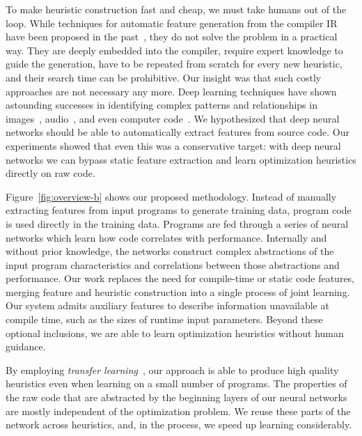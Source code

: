 To make heuristic construction fast and cheap, we must take humans out of the loop. While techniques for automatic feature generation from the compiler IR have been proposed in the past~\cite{Namolaru2010a,Leather2014}, they do not solve the problem in a practical way. They are deeply embedded into the compiler, require expert knowledge to guide the generation, have to be repeated from scratch for every new heuristic, and their search time can be prohibitive. Our insight was that such costly approaches are not necessary any more. Deep learning techniques have shown astounding successes in identifying complex patterns and relationships in images~\cite{Krizhevsky2012,He2016}, audio~\cite{Lee2009b}, and even computer code~\cite{Allamanis2014,Allamanis2014a}. We hypothesized that deep neural networks should be able to automatically extract features from source code. Our experiments showed that even this was a conservative target: with deep neural networks we can bypass static feature extraction and learn optimization heuristics directly on raw code.

Figure~\ref{fig:overview-b} shows our proposed methodology. Instead of manually extracting features from input programs to generate training data, program code is used directly in the training data. Programs are fed through a series of neural networks which learn how code correlates with performance. Internally and without prior knowledge, the networks construct complex abstractions of the input program characteristics and correlations between those abstractions and performance. Our work replaces the need for compile-time or static code features, merging feature and heuristic construction into a single process of joint learning. Our system admits auxiliary features to describe information unavailable at compile time, such as the sizes of runtime input parameters. Beyond these optional inclusions, we are able to learn optimization heuristics without human guidance.

By employing \emph{transfer learning}~\cite{Yosinski2014}, our approach is able to produce high quality heuristics even when learning on a small number of programs. The properties of the raw code that are abstracted by the beginning layers of our neural networks are mostly independent of the optimization problem. We reuse these parts of the network across heuristics, and, in the process, we speed up learning considerably.

